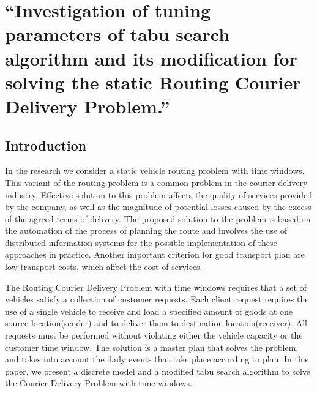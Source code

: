 \documentclass[]{TAACpaper}
\begin{document}

\def\dd#1#2{\frac{\partial#1}{\partial#2}}
\section{
``Investigation of tuning parameters of tabu search algorithm and its modification  for solving the static Routing Courier Delivery Problem.'' 
}



\subsection{Introduction}
In the research we consider a static vehicle routing problem with time windows. This variant of the routing problem is a common problem in the courier delivery industry. Effective solution to this problem affects the quality of services provided by the company, as well as the magnitude of potential losses caused by the excess of the agreed terms of delivery. The proposed solution to the problem is based on the automation of the process of planning the route and involves the use of distributed information systems for the possible implementation of these approaches in practice. Another important criterion for good transport plan are low transport costs, which affect the cost of services.

The Routing Courier Delivery Problem with time windows requires that a set of vehicles satisfy a collection of customer requests. Each client request requires the use of a single vehicle to receive and load a specified amount of goods at one source location(sender) and to deliver them to destination location(receiver). All requests must be performed without violating either the vehicle capacity or the customer time window. The solution is a master plan that solves the problem, and takes into account the daily events that take place according to plan. In this paper, we present a discrete model and a modified tabu search algorithm  to solve the  Courier Delivery Problem with time windows. 
\end{document}
